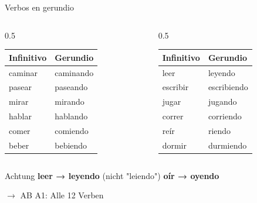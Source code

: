 \documentclass[aspectratio=169, 14pt]{beamer}
\newcommand{\es}[1]{\textbf{#1}}
\newcommand{\abmark}[1]{\textcolor{spanisch}{$\rightarrow$ AB #1}}
\begin{document}
\begin{frame}{Verbos en gerundio}

\begin{columns}
\begin{column}{0.5\textwidth}
\begin{tabular}{ll}
\toprule
\textbf{Infinitivo} & \textbf{Gerundio} \\
\midrule
caminar & caminando \\
pasear & paseando \\
mirar & mirando \\
hablar & hablando \\
comer & comiendo \\
beber & bebiendo \\
\bottomrule
\end{tabular}
\end{column}

\begin{column}{0.5\textwidth}
\begin{tabular}{ll}
\toprule
\textbf{Infinitivo} & \textbf{Gerundio} \\
\midrule
leer & \textcolor{spanisch}{leyendo} \\
escribir & escribiendo \\
jugar & jugando \\
correr & corriendo \\
reír & \textcolor{spanisch}{riendo} \\
dormir & durmiendo \\
\bottomrule
\end{tabular}
\end{column}
\end{columns}

\vspace{1em}

\begin{alertblock}{Achtung}
\es{leer → leyendo} (nicht "leiendo") \quad \es{oír → oyendo}
\end{alertblock}

\abmark{A1: Alle 12 Verben}

\end{frame}
\end{document}
